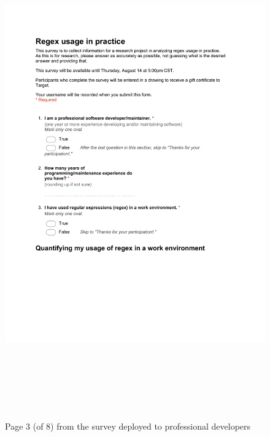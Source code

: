 \begin{figure}[!htbp]
   \centering
       \includegraphics[page=3, height=21cm,keepaspectratio]{nontex/appendix/regexUsageInPracticeSurvey}
 \caption{Page 3 (of 8) from the survey deployed to professional developers}
 \label{fig:surveyPDF3}
\end{figure}
